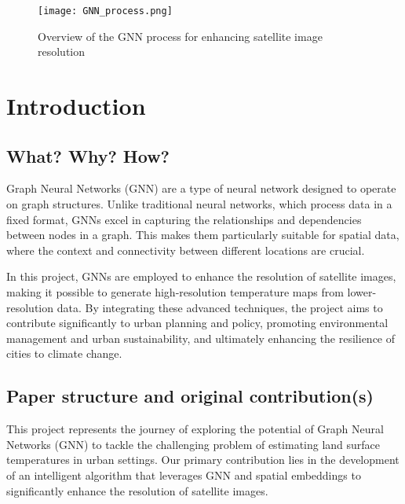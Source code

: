 \documentclass[runningheads,a4paper,11pt]{report}
\begin{document}
\begin{figure}[H]
\centering
\texttt{[image: GNN\_process.png]}
\caption{Overview of the GNN process for enhancing satellite image resolution}
\label{fig:GNN_process}
\end{figure}


\tableofcontents

\newpage

\listoftables
\listoffigures
\listofalgorithms

\newpage




\newpage



 


\chapter{Introduction}\label{chapter:introduction}
\section{What? Why? How?}\label{section:what}

Graph Neural Networks (GNN) are a type of neural network designed to operate on graph structures. Unlike traditional neural networks, which process data in a fixed format, GNNs excel in capturing the relationships and dependencies between nodes in a graph. This makes them particularly suitable for spatial data, where the context and connectivity between different locations are crucial.

In this project, GNNs are employed to enhance the resolution of satellite images, making it possible to generate high-resolution temperature maps from lower-resolution data. By integrating these advanced techniques, the project aims to contribute significantly to urban planning and policy, promoting environmental management and urban sustainability, and ultimately enhancing the resilience of cities to climate change.

\section{Paper structure and original contribution(s)}\label{section:structure}
This project represents the journey of exploring the potential of Graph Neural Networks (GNN) to tackle the challenging problem of estimating land surface temperatures in urban settings. Our primary contribution lies in the development of an intelligent algorithm that leverages GNN and spatial embeddings to significantly enhance the resolution of satellite images.
\end{document}
